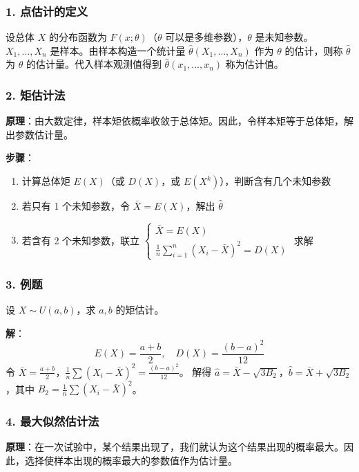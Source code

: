 \documentclass[12pt,a4paper]{ctexart}
\begin{document}
\subsubsection{1. 点估计的定义}
设总体 $X$ 的分布函数为 $F(x; \theta)$（$\theta$ 可以是多维参数），$\theta$ 是未知参数。$X_1, \dots, X_n$ 是样本。由样本构造一个统计量 $\hat{\theta}(X_1, \dots, X_n)$ 作为 $\theta$ 的估计，则称 $\hat{\theta}$ 为 $\theta$ 的估计量。代入样本观测值得到 $\hat{\theta}(x_1, \dots, x_n)$ 称为估计值。

\subsubsection{2. 矩估计法}
\textbf{原理}：由大数定律，样本矩依概率收敛于总体矩。因此，令样本矩等于总体矩，解出参数估计量。

\textbf{步骤}：
\begin{enumerate}[noitemsep]
    \item 计算总体矩 $E(X)$（或 $D(X)$，或 $E(X^k)$），判断含有几个未知参数
    \item 若只有 1 个未知参数，令 $\bar{X} = E(X)$，解出 $\hat{\theta}$
    \item 若含有 2 个未知参数，联立 $\begin{cases} \bar{X} = E(X) \\ \frac{1}{n} \sum_{i=1}^n (X_i - \bar{X})^2 = D(X) \end{cases}$ 求解
\end{enumerate}

\subsubsection{3. 例题}
设 $X \sim U(a, b)$，求 $a, b$ 的矩估计。

\textbf{解}：
\[
    E(X) = \frac{a+b}{2},\quad D(X) = \frac{(b-a)^2}{12}
\]
令 $\bar{X} = \frac{a+b}{2}$，$\frac{1}{n} \sum (X_i - \bar{X})^2 = \frac{(b-a)^2}{12}$。
解得 $\hat{a} = \bar{X} - \sqrt{3B_2}$，$\hat{b} = \bar{X} + \sqrt{3B_2}$，其中 $B_2 = \frac{1}{n} \sum (X_i - \bar{X})^2$。

\subsubsection{4. 最大似然估计法}
\textbf{原理}：在一次试验中，某个结果出现了，我们就认为这个结果出现的概率最大。因此，选择使样本出现的概率最大的参数值作为估计量。
\end{document}

